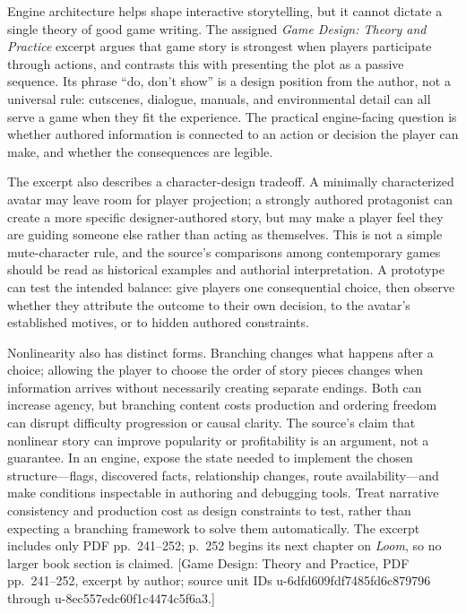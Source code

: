 Engine architecture helps shape interactive storytelling, but it cannot dictate a single theory of good game writing. The assigned \emph{Game Design: Theory and Practice} excerpt argues that game story is strongest when players participate through actions, and contrasts this with presenting the plot as a passive sequence. Its phrase ``do, don't show'' is a design position from the author, not a universal rule: cutscenes, dialogue, manuals, and environmental detail can all serve a game when they fit the experience. The practical engine-facing question is whether authored information is connected to an action or decision the player can make, and whether the consequences are legible.

The excerpt also describes a character-design tradeoff. A minimally characterized avatar may leave room for player projection; a strongly authored protagonist can create a more specific designer-authored story, but may make a player feel they are guiding someone else rather than acting as themselves. This is not a simple mute-character rule, and the source's comparisons among contemporary games should be read as historical examples and authorial interpretation. A prototype can test the intended balance: give players one consequential choice, then observe whether they attribute the outcome to their own decision, to the avatar's established motives, or to hidden authored constraints.

Nonlinearity also has distinct forms. Branching changes what happens after a choice; allowing the player to choose the order of story pieces changes when information arrives without necessarily creating separate endings. Both can increase agency, but branching content costs production and ordering freedom can disrupt difficulty progression or causal clarity. The source's claim that nonlinear story can improve popularity or profitability is an argument, not a guarantee. In an engine, expose the state needed to implement the chosen structure---flags, discovered facts, relationship changes, route availability---and make conditions inspectable in authoring and debugging tools. Treat narrative consistency and production cost as design constraints to test, rather than expecting a branching framework to solve them automatically. The excerpt includes only PDF pp.~241--252; p.~252 begins its next chapter on \emph{Loom}, so no larger book section is claimed. {[}Game Design: Theory and Practice, PDF pp.~241--252, excerpt by author; source unit IDs u-6dfd609fdf7485fd6c879796 through u-8ec557edc60f1c4474c5f6a3.{]}

